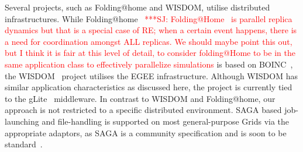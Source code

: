 \documentclass{rspublic}
\newcommand{\alnote}[1]{ {\textcolor{blue} { ***AL: #1 }}}
\newcommand{\jhanote}[1]{ {\textcolor{red} { ***SJ: #1 }}}
\newcommand{\alnote}[1]{}
\newcommand{\jhanote}[1]{}
\begin{document}

Several projects, such as Folding@home and WISDOM, utilise distributed
infrastructures. While
Folding@home~\citep{PhysRevLett.86.4983}\jhanote{Folding@Home~\citep{PhysRevLett.86.4983}
is parallel replica dynamics but that is a special case of
RE; when a certain event happens, there is a need for
coordination amongst ALL replicas. We should maybe point this out,
but I think it is fair at this level of detail, to consider
folding@Home to be in the same application class to effectively
parallelize simulations} is based on BOINC~\citep{1033223}, the
WISDOM~\citep{wisdom} project utilises the EGEE infrastructure. 
Although WISDOM has similar application characteristics as discussed
here, the project is currently tied to the gLite~\citep{glite}
middleware.  In contrast to WISDOM and Folding@home, our approach is
not restricted to a specific distributed environment. SAGA based
job-launching and file-handling is supported on most general-purpose
Grids via the appropriate adaptors, as SAGA is a community
specification and is soon to be standard~\citep{saga_url}.       
\end{document}

